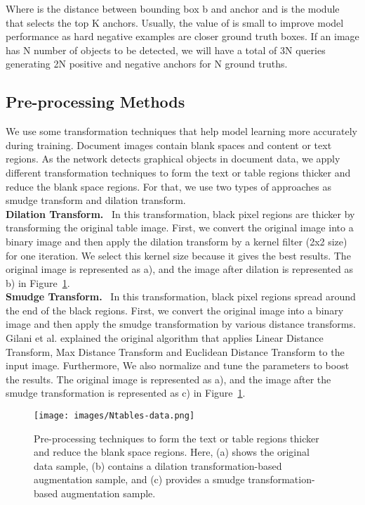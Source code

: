 \documentclass[sn-mathphys]{sn-jnl}\jyear{2021}\theoremstyle{thmstyleone}\newtheorem{theorem}{Theorem}\newtheorem{proposition}[theorem]{Proposition}\theoremstyle{thmstyletwo}\newtheorem{example}{Example}\newtheorem{remark}{Remark}\theoremstyle{thmstylethree}\newtheorem{definition}{Definition}\usepackage{amsmath}
\begin{document}
 Where  is the distance between bounding box b and anchor and  is the module that selects the top K anchors. Usually, the value of  is small to improve model performance as hard negative examples are closer ground truth boxes. If an image has N number of objects to be detected, we will have a total of 3N queries generating 2N positive and negative anchors for N ground truths. \\
\subsection{Pre-processing Methods}
 We use some transformation techniques that help model learning more accurately during training. Document images contain blank spaces and content or text regions. As the network detects graphical objects in document data, we apply different transformation techniques to form the text or table regions thicker and reduce the blank space regions. For that, we use two types of approaches as smudge transform and dilation transform.\\

\noindent\textbf{Dilation Transform.}~
In this transformation, black pixel regions are thicker by transforming the original table image. First, we convert the original image into a binary image and then apply the dilation transform by a kernel filter (2x2 size) for one iteration. We select this kernel size because it gives the best results. The original image is represented as a), and the image after dilation is represented as b) in Figure~\ref{fig:trans}. \\

\noindent\textbf{Smudge Transform.}~
In this transformation, black pixel regions spread around the end of the black regions. First, we convert the original image into a binary image and then apply the smudge transformation by various distance transforms. Gilani et al. \cite{Azka62} explained the original algorithm that applies Linear Distance Transform, Max Distance Transform and Euclidean Distance Transform to the input image. Furthermore, We also normalize and tune the parameters to boost the results. The original image is represented as a), and the image after the smudge transformation is represented as c) in Figure~\ref{fig:trans}. 
\begin{figure}
\centering
\texttt{[image: images/Ntables-data.png]}
\caption{Pre-processing techniques to
form the text or table regions thicker and reduce the blank space regions. Here, (a) shows the original data sample, (b) contains a dilation transformation-based augmentation sample, and (c) provides a smudge transformation-based augmentation sample.}\label{fig:trans}
\end{figure}
\end{document}
